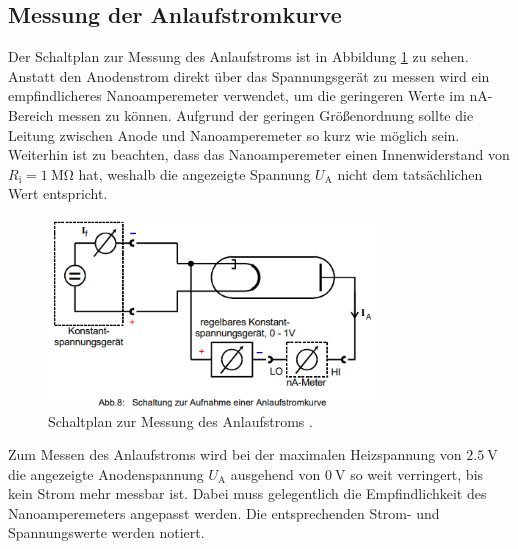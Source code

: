 \subsection{Messung der Anlaufstromkurve}
Der Schaltplan zur Messung des Anlaufstroms ist in Abbildung \ref{fig:schaltung_anlaufstrom} zu sehen.
Anstatt den Anodenstrom direkt über das Spannungsgerät zu messen wird ein empfindlicheres Nanoamperemeter verwendet, 
um die geringeren Werte im $\unit{\nano\ampere}$-Bereich messen zu können.
Aufgrund der geringen Größenordnung sollte die Leitung zwischen Anode und Nanoamperemeter so kurz wie möglich sein.
Weiterhin ist zu beachten, dass das Nanoamperemeter einen Innenwiderstand von $R_\text{i} = \qty[]{1}{\mega\ohm}$ hat, 
weshalb die angezeigte Spannung $U_\text{A}$ nicht dem tatsächlichen Wert entspricht.

\begin{figure}
    \centering
    \includegraphics[height = 5cm]{Abbildungen/schaltung_anlaufstrom.png}
    \caption{Schaltplan zur Messung des Anlaufstroms \cite[]{man:v504}.}
    \label{fig:schaltung_anlaufstrom}
\end{figure}

\noindent
Zum Messen des Anlaufstroms wird bei der maximalen Heizspannung von $\qty[]{2.5}{\volt}$ die angezeigte Anodenspannung $U_\text{A}$
ausgehend von $\qty{0}{\volt}$ so weit verringert, bis kein Strom mehr messbar ist.
Dabei muss gelegentlich die Empfindlichkeit des Nanoamperemeters angepasst werden.
Die entsprechenden Strom- und Spannungswerte werden notiert.
